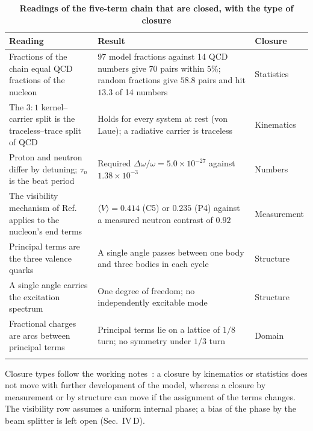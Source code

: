 \documentclass[%
 reprint, amsmath,amssymb, aps, prb, ]{revtex4-2}
\numberwithin{equation}{section}
\begin{document}
\begin{table}[t!]
\centering
\caption{\textbf{Readings of the five-term chain that are closed, with the type of closure}}
\label{tab:closed}
\renewcommand{\arraystretch}{1.4}
\begin{tabular}{p{5.4cm}p{7.6cm}p{2.5cm}}
\toprule
\textbf{Reading} & \textbf{Result} & \textbf{Closure} \\
\midrule
Fractions of the chain equal QCD fractions of the nucleon
& 97 model fractions against 14 QCD numbers give 70 pairs within $5\%$; random fractions give $58.8$ pairs and hit $13.3$ of 14 numbers
& Statistics \\
\addlinespace[0.3cm]
The $3{:}1$ kernel--carrier split is the traceless--trace split of QCD
& Holds for every system at rest (von Laue); a radiative carrier is traceless
& Kinematics \\
\addlinespace[0.3cm]
Proton and neutron differ by detuning; $\tau_n$ is the beat period
& Required $\Delta\omega/\omega=5.0\times10^{-27}$ against $1.38\times10^{-3}$
& Numbers \\
\addlinespace[0.3cm]
The visibility mechanism of Ref.~\cite{ref:p38} applies to the nucleon's end terms
& $\langle V\rangle=0.414$ (C5) or $0.235$ (P4) against a measured neutron contrast of $0.92$
& Measurement \\
\addlinespace[0.3cm]
Principal terms are the three valence quarks
& A single angle passes between one body and three bodies in each cycle
& Structure \\
\addlinespace[0.3cm]
A single angle carries the excitation spectrum
& One degree of freedom; no independently excitable mode
& Structure \\
\addlinespace[0.3cm]
Fractional charges are arcs between principal terms
& Principal terms lie on a lattice of $1/8$ turn; no symmetry under $1/3$ turn
& Domain \\
\addlinespace[0.2cm]
\bottomrule
\end{tabular}
\vspace{0.2cm}
\begin{minipage}{0.95\textwidth}
\justifying\footnotesize
Closure types follow the working notes~\cite{ref:trunks}: a closure by kinematics or statistics does not move with further development of the model, whereas a closure by measurement or by structure can move if the assignment of the terms changes. The visibility row assumes a uniform internal phase; a bias of the phase by the beam splitter is left open (Sec.~IV\,D).
\end{minipage}
\end{table}
\end{document}
